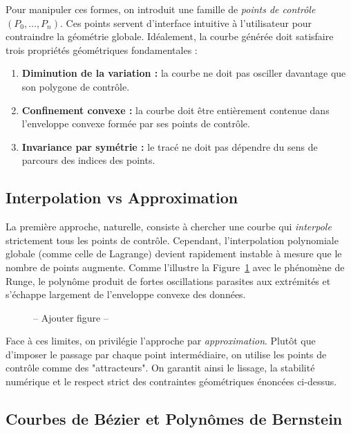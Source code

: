 Pour manipuler ces formes, on introduit une famille de \emph{points de contrôle} $(P_0, \dots, P_n)$. Ces points servent d'interface intuitive à l'utilisateur pour contraindre la géométrie globale. Idéalement, la courbe générée doit satisfaire trois propriétés géométriques fondamentales :
\begin{enumerate}
    \item \textbf{Diminution de la variation :} la courbe ne doit pas osciller davantage que son polygone de contrôle.
    \item \textbf{Confinement convexe :} la courbe doit être entièrement contenue dans l'enveloppe convexe formée par ses points de contrôle.
    \item \textbf{Invariance par symétrie :} le tracé ne doit pas dépendre du sens de parcours des indices des points.
\end{enumerate}

\subsection{Interpolation vs Approximation}

La première approche, naturelle, consiste à chercher une courbe qui \emph{interpole} strictement tous les points de contrôle. Cependant, l'interpolation polynomiale globale (comme celle de Lagrange) devient rapidement instable à mesure que le nombre de points augmente. Comme l'illustre la Figure~\ref{fig:lagrange_runge} avec le phénomène de Runge, le polynôme produit de fortes oscillations parasites aux extrémités et s'échappe largement de l'enveloppe convexe des données.

\begin{figure}[htbp]
    \centering
    -- Ajouter figure --
    \caption{}
    \label{fig:lagrange_runge}
\end{figure}

Face à ces limites, on privilégie l'approche par \emph{approximation}. Plutôt que d'imposer le passage par chaque point intermédiaire, on utilise les points de contrôle comme des "attracteurs". On garantit ainsi le lissage, la stabilité numérique et le respect strict des contraintes géométriques énoncées ci-dessus.

\subsection{Courbes de Bézier et Polynômes de Bernstein}

